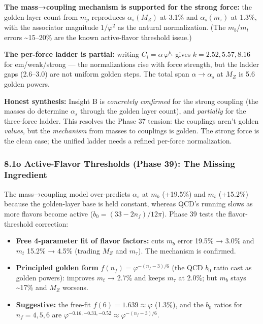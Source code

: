 \documentclass[
]{article}
\providecommand{\tightlist}{%
  \setlength{\itemsep}{0pt}\setlength{\parskip}{0pt}}
\begin{document}
\textbf{The mass→coupling mechanism is supported for the strong force:}
the golden-layer count from \(m_p\) reproduces \(\alpha_s(M_Z)\) at
3.1\% and \(\alpha_s(m_\tau)\) at 1.3\%, with the associator magnitude
\(1/\varphi^2\) as the natural normalization. (The \(m_b\)/\(m_t\)
errors \textasciitilde15--20\% are the known active-flavor threshold
issue.)

\textbf{The per-force ladder is partial:} writing
\(C_i = \alpha\,\varphi^{k_i}\) gives \(k = 2.52, 5.57, 8.16\) for
em/weak/strong --- the normalizations rise with force strength, but the
ladder gaps (2.6--3.0) are not uniform golden steps. The total span
\(\alpha \to \alpha_s\) at \(M_Z\) is 5.6 golden powers.

\textbf{Honest synthesis:} Insight B is \emph{concretely confirmed} for
the strong coupling (the masses do determine \(\alpha_s\) through the
golden layer count), and \emph{partially} for the three-force ladder.
This resolves the Phase 37 tension: the couplings aren't golden
\emph{values}, but the \emph{mechanism} from masses to couplings is
golden. The strong force is the clean case; the unified ladder needs a
refined per-force normalization.

\subsubsection{8.1o Active-Flavor Thresholds (Phase 39): The Missing
Ingredient}\label{o-active-flavor-thresholds-phase-39-the-missing-ingredient}

The mass→coupling model over-predicts \(\alpha_s\) at \(m_b\) (+19.5\%)
and \(m_t\) (+15.2\%) because the golden-layer base is held constant,
whereas QCD's running slows as more flavors become active
(\(b_0 = (33-2n_f)/12\pi\)). Phase 39 tests the flavor-threshold
correction:

\begin{itemize}
\tightlist
\item
  \textbf{Free 4-parameter fit of flavor factors:} cuts \(m_b\) error
  19.5\% → 3.0\% and \(m_t\) 15.2\% → 4.5\% (trading \(M_Z\) and
  \(m_\tau\)). The mechanism is confirmed.
\item
  \textbf{Principled golden form} \(f(n_f) = \varphi^{-(n_f-3)/6}\) (the
  QCD \(b_0\) ratio cast as golden powers): improves \(m_t\) → 2.7\% and
  keeps \(m_\tau\) at 2.0\%; but \(m_b\) stays \textasciitilde17\% and
  \(M_Z\) worsens.
\item
  \textbf{Suggestive:} the free-fit \(f(6) = 1.639 \approx \varphi\)
  (1.3\%), and the \(b_0\) ratios for \(n_f = 4,5,6\) are
  \(\varphi^{-0.16,-0.33,-0.52} \approx \varphi^{-(n_f-3)/6}\).
\end{itemize}
\end{document}
